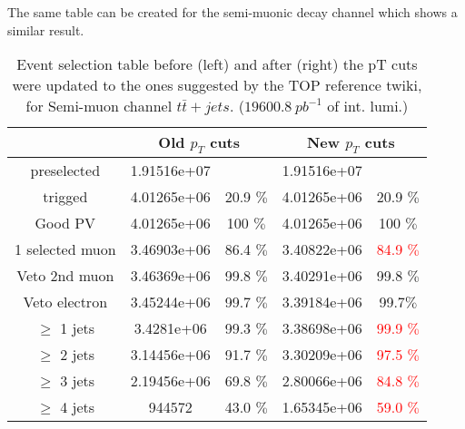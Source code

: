 \newpage
The same table can be created for the semi-muonic decay channel which shows a similar result.\\
\begin{table}
\caption{Event selection table before (left) and after (right) the pT cuts were updated to the ones suggested by the TOP reference twiki, for Semi-muon channel $t\bar{t}+jets$. ($19600.8~pb^{-1}$ of int. lumi.)}
\centering
\begin{tabular}{|c|c|c|c|c|}
\hline
				& \multicolumn{2}{|c|}{Old $p_T$ cuts}	& \multicolumn{2}{|c|}{New $p_T$ cuts}	\\
\hline
preselected			& 1.91516e+07	& 		 	& 1.91516e+07	&	 		\\

trigged				& 4.01265e+06	&	20.9 $\%$	& 4.01265e+06	&	20.9 $\%$	\\

Good PV				& 4.01265e+06	&	 100 $\%$	& 4.01265e+06	&	100 $\%$	\\

1 selected muon			& 3.46903e+06	&	 86.4 $\%$	& 3.40822e+06	&	\textcolor{red}{84.9 $\%$}	\\

Veto 2nd muon			& 3.46369e+06	&	 99.8 $\%$	& 3.40291e+06	&	99.8 $\%$	\\

Veto electron			& 3.45244e+06	&	 99.7 $\%$	& 3.39184e+06	&	99.7$\%$	\\

$\geq$ 1 jets			& 3.4281e+06	&	 99.3 $\%$	& 3.38698e+06	&	\textcolor{red}{99.9 $\%$}	\\

$\geq$ 2 jets			& 3.14456e+06	&	 91.7 $\%$	& 3.30209e+06	&	\textcolor{red}{97.5 $\%$}	\\

$\geq$ 3 jets			& 2.19456e+06	&	 69.8 $\%$	& 2.80066e+06	&	\textcolor{red}{84.8 $\%$}	\\

$\geq$ 4 jets			& 944572	&	 43.0 $\%$	& 1.65345e+06	&	\textcolor{red}{59.0 $\%$}	\\
\hline
\end{tabular}
\end{table}

\newpage
